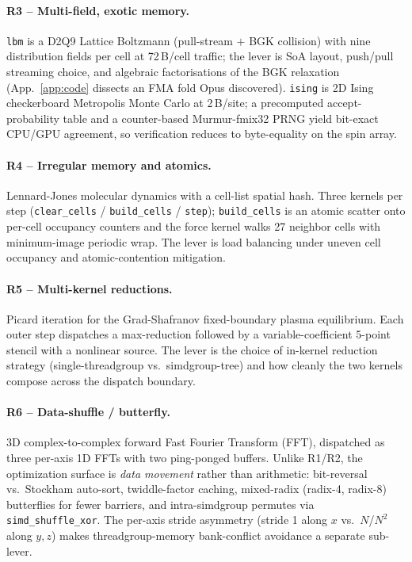 \documentclass{article}
\theoremstyle{plain}
\theoremstyle{definition}
\theoremstyle{remark}
\begin{document}
\paragraph{R3 -- Multi-field, exotic memory.} \texttt{lbm} is a D2Q9
Lattice Boltzmann (pull-stream $+$ BGK collision) with nine
distribution fields per cell at 72\,B/cell traffic; the lever is
SoA layout, push/pull streaming choice, and algebraic factorisations
of the BGK relaxation (App.~\ref{app:code} dissects an FMA fold
Opus discovered). \texttt{ising} is 2D Ising checkerboard Metropolis
Monte Carlo at 2\,B/site; a precomputed accept-probability table and a
counter-based Murmur-fmix32 PRNG yield bit-exact CPU/GPU agreement,
so verification reduces to byte-equality on the spin array.

\paragraph{R4 -- Irregular memory and atomics.} Lennard-Jones molecular dynamics
with a cell-list spatial hash. Three kernels per step
(\texttt{clear\_cells} / \texttt{build\_cells} / \texttt{step});
\texttt{build\_cells} is an atomic scatter onto per-cell occupancy
counters and the force kernel walks 27 neighbor cells with
minimum-image periodic wrap. The lever is load balancing under
uneven cell occupancy and atomic-contention mitigation.

\paragraph{R5 -- Multi-kernel reductions.} Picard iteration for the
Grad-Shafranov fixed-boundary plasma equilibrium. Each outer step
dispatches a max-reduction
followed by a variable-coefficient 5-point stencil with a nonlinear
source. The lever is the choice of in-kernel reduction strategy 
(single-threadgroup vs.\ simdgroup-tree) and how cleanly the two
kernels compose across the dispatch boundary.

\paragraph{R6 -- Data-shuffle / butterfly.} 3D complex-to-complex
forward Fast Fourier Transform (FFT), dispatched as three per-axis 1D FFTs with two
ping-ponged buffers. Unlike R1/R2, the optimization surface is
\emph{data movement} rather than arithmetic: bit-reversal vs.\
Stockham auto-sort, twiddle-factor caching, mixed-radix (radix-4,
radix-8) butterflies for fewer barriers, and intra-simdgroup
permutes via \texttt{simd\_shuffle\_xor}. The per-axis stride
asymmetry (stride 1 along $x$ vs.\ $N$/$N^2$ along $y,z$) makes
threadgroup-memory bank-conflict avoidance a separate sub-lever.
\end{document}

